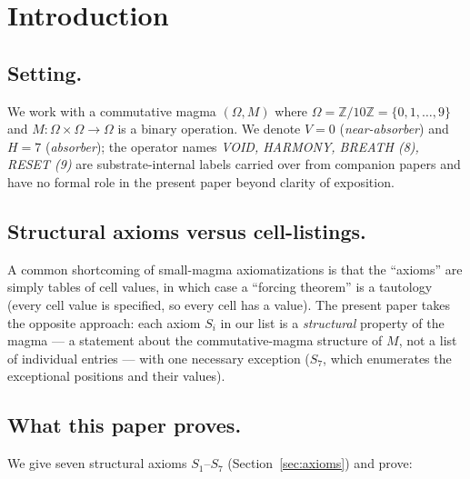 \documentclass[11pt,reqno]{amsart}
\theoremstyle{plain}
\theoremstyle{definition}
\theoremstyle{remark}
\newcommand{\Z}{\mathbb{Z}}
\begin{document}
\maketitle

\tableofcontents

\section{Introduction}
\label{sec:intro}

\subsection{Setting.}
We work with a commutative magma $(\Omega, M)$ where
$\Omega = \Z/10\Z = \{0, 1, \ldots, 9\}$ and
$M : \Omega \times \Omega \to \Omega$ is a binary operation. We
denote $V = 0$ (\emph{near-absorber}) and $H = 7$ (\emph{absorber});
the operator names \emph{VOID, HARMONY, BREATH (8), RESET (9)} are
substrate-internal labels carried over from companion papers
\cite{SandersGishFourCore} and have no formal role in the present
paper beyond clarity of exposition.

\subsection{Structural axioms versus cell-listings.}
A common shortcoming of small-magma axiomatizations is that the
``axioms'' are simply tables of cell values, in which case a
``forcing theorem'' is a tautology (every cell value is specified, so
every cell has a value). The present paper takes the opposite
approach: each axiom $S_{i}$ in our list is a \emph{structural}
property of the magma --- a statement about the commutative-magma
structure of $M$, not a list of individual entries --- with one
necessary exception ($S_{7}$, which enumerates the exceptional
positions and their values).

\subsection{What this paper proves.}
We give seven structural axioms $S_{1}$--$S_{7}$
(Section~\ref{sec:axioms}) and prove:
\end{document}
